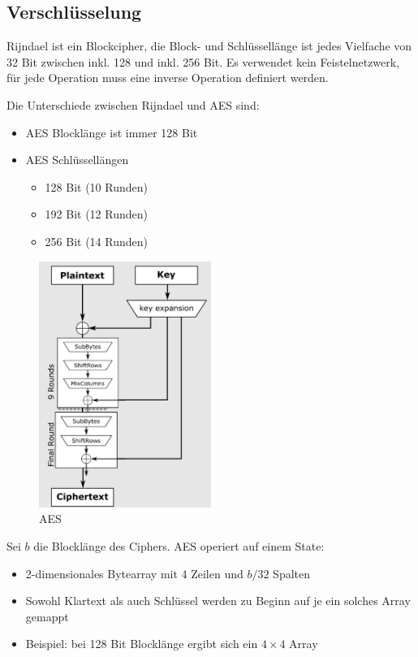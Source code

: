 \subsection{Verschlüsselung}

Rijndael ist ein Blockcipher, die Block- und Schlüssellänge ist jedes Vielfache von 32 Bit zwischen inkl. 128 und inkl. 256 Bit.
Es verwendet kein Feistelnetzwerk, für jede Operation muss eine inverse Operation definiert werden.

Die Unterschiede zwischen Rijndael und AES sind:
\begin{itemize}
    \item AES Blocklänge ist immer 128 Bit
    \item AES Schlüssellängen
    \begin{itemize}
        \item 128 Bit (10 Runden)
        \item 192 Bit (12 Runden)
        \item 256 Bit (14 Runden)
    \end{itemize}
\end{itemize}

\begin{figure}[h]
    \includegraphics[width=0.5\textwidth]{figures/fig6-aes}
    \centering
    \caption{AES}
\end{figure}

Sei $b$ die Blocklänge des Ciphers. AES operiert auf einem State:
\begin{itemize}
    \item 2-dimensionales Bytearray mit 4 Zeilen und $b/32$ Spalten
    \item Sowohl Klartext als auch Schlüssel werden zu Beginn auf je ein solches Array gemappt
    \item Beispiel: bei 128 Bit Blocklänge ergibt sich ein $4 \times 4$ Array
\end{itemize}


